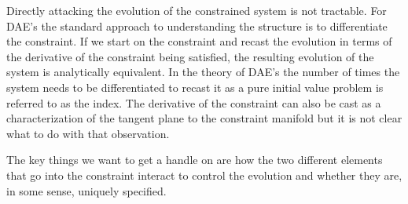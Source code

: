\documentclass[final]{siamltex}
\begin{document}
Directly attacking the evolution of the constrained system is not tractable.
For DAE's the standard approach to understanding the structure is to differentiate the constraint.
If we start on the constraint and recast the evolution in terms of the derivative of the constraint
being satisfied, the resulting evolution of the system is analytically equivalent.  In the theory
of DAE's the number of times the system needs to be differentiated to recast it as a pure initial
value problem is referred to as the index.
The derivative of the constraint can also be cast as a characterization of the tangent plane to the
constraint manifold but it is not clear what to do with that observation.

The key things we want to get a handle on are how the two different elements that go into the
constraint interact to control the evolution and whether they are, in some sense, uniquely specified.
\end{document}
